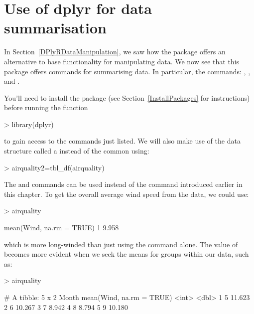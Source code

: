  
 
 
\section{Use of dplyr for data summarisation} 
\label{DPlyRDataSummarisation} 
 
 
In Section~\ref{DPlyRDataManipulation}, we saw how the  package offers an alternative to base \R{} functionality for manipulating data. We now see that this package offers commands for summarising data. In particular, the commands: , , and . 
   
You'll need to install the package (see Section~\ref{InstallPackages} for instructions) before running the function 
\begin{Schunk}
\begin{Sinput}
> library(dplyr) 
\end{Sinput}
\end{Schunk}
to gain access to the commands just listed. We will also make use of the  data structure called a  instead of the common  using: 
\begin{Schunk}
\begin{Sinput}
> airquality2=tbl_df(airquality) 
\end{Sinput}
\end{Schunk}
 
 
The   and  commands can be used instead of the  command introduced earlier in this chapter. To get the overall average wind speed from the  data, we could use: 
\begin{Schunk}
\begin{Sinput}
> airquality %>% summarise(mean(Wind, na.rm = TRUE)) 
\end{Sinput}
\begin{Soutput}
  mean(Wind, na.rm = TRUE)
1                    9.958
\end{Soutput}
\end{Schunk}
which is more long-winded than just using the  command alone. The value of  becomes more evident when we seek the means for groups within our data, such as: 
\begin{Schunk}
\begin{Sinput}
> airquality%>% group_by(Month) %>% summarise(mean(Wind, na.rm = TRUE)) 
\end{Sinput}
\begin{Soutput}
# A tibble: 5 x 2
  Month mean(Wind, na.rm = TRUE)
  <int>                    <dbl>
1     5                   11.623
2     6                   10.267
3     7                    8.942
4     8                    8.794
5     9                   10.180
\end{Soutput}
\end{Schunk}
 
